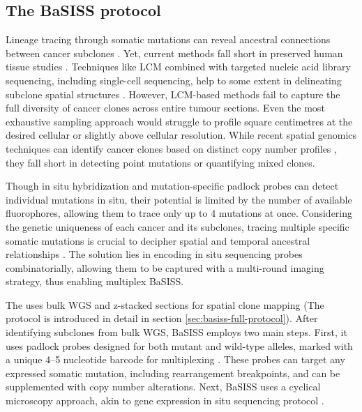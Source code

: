 \subsection{The \ac{BaSISS} protocol}
\label{sec:basiss-intro}
Lineage tracing through somatic mutations can reveal ancestral connections between cancer subclones . Yet, current methods fall short in preserved human tissue studies \parencite{Yates2015-xk,Jamal-Hanjani2017-uv,Jones2008-sd,Shah2009-xz,Casasent2018-gx,Tarabichi2021-xx}. Techniques like \acf{LCM} combined with targeted nucleic acid library sequencing, including single-cell sequencing, help to some extent in delineating subclone spatial structures \parencite{Shen2000-xj,Casasent2018-gx}. However, \ac{LCM}-based methods fail to capture the full diversity of cancer clones across entire tumour sections. Even the most exhaustive sampling approach would struggle to profile square centimetres at the desired cellular or slightly above cellular resolution. While recent spatial genomics techniques can identify cancer clones based on distinct copy number profiles \parencite{Zhao2022-xd,Erickson2022-zh}, they fall short in detecting point mutations or quantifying mixed clones.

Though in situ hybridization \parencite{Janiszewska2015-kb} and mutation-specific padlock probes \parencite{Larsson2010-bp,Grundberg2013-te,Ke2013-ux,Baker2017-dv} can detect individual mutations in situ, their potential is limited by the number of available fluorophores, allowing them to trace only up to 4 mutations at once. Considering the genetic uniqueness of each cancer and its subclones, tracing multiple specific somatic mutations is crucial to decipher spatial and temporal ancestral relationships \parencite{Nik-Zainal2012-zz}. The solution lies in encoding in situ sequencing probes combinatorially, allowing them to be captured with a multi-round imaging strategy, thus enabling multiplex \acf{BaSISS}.

The  uses bulk \ac{WGS} and z-stacked sections for spatial clone mapping (The protocol is introduced in detail in section \cref{sec:basiss-full-protocol}). After identifying subclones from bulk WGS, \ac{BaSISS} employs two main steps. First, it uses padlock probes designed for both mutant and wild-type alleles, marked with a unique 4–5 nucleotide barcode for multiplexing \parencite{Ke2013-ux}. These probes can target any expressed somatic mutation, including rearrangement breakpoints, and can be supplemented with copy number alterations. Next, \ac{BaSISS}  uses a cyclical microscopy approach, akin to gene expression in situ sequencing protocol \parencite{Ke2013-ux,Svedlund2019-xb} .

